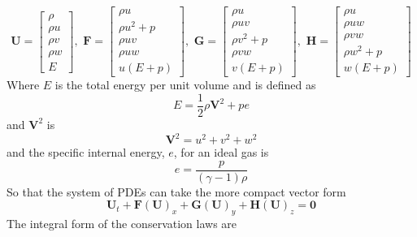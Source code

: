 \begin{equation}
	\boldsymbol{U} =
	\begin{bmatrix}
		\rho\\
		\rho u\\
		\rho v\\
		\rho w\\
		E
	\end{bmatrix},\,\,
	\boldsymbol{F} =
	\begin{bmatrix}
		\rho u\\
		\rho u^2 + p\\
		\rho u v\\
		\rho u w\\
		u\left(E + p\right)
	\end{bmatrix},\,\,
	\boldsymbol{G} =
	\begin{bmatrix}
		\rho u\\
		\rho u v\\
		\rho v^2 + p\\
		\rho v w\\
		v\left(E + p\right)
	\end{bmatrix},\,\,
	\boldsymbol{H} =
	\begin{bmatrix}
		\rho u\\
		\rho u w\\
		\rho v w\\
		\rho w^2 + p\\
		w\left(E + p\right)
	\end{bmatrix}
\end{equation}
Where $E$ is the total energy per unit volume and is defined as
\begin{equation}
	E = \frac{1}{2} \rho \boldsymbol{V}^2 + pe
\end{equation}
and $\boldsymbol{V}^2$ is
\begin{equation}
	\boldsymbol{V}^2 = u^2 + v^2 + w^2
\end{equation}
and the specific internal energy, $e$, for an ideal gas is
\begin{equation}\label{eqn:idealgasEOS}
	e = \frac{p}{\left(\gamma - 1\right) \rho}
\end{equation}
So that the system of PDEs can take the more compact vector form
\begin{equation}\label{eqn:EulerVector}
	\boldsymbol{U}_t + \boldsymbol{F}\left(\boldsymbol{U}\right)_x + \boldsymbol{G}\left(\boldsymbol{U}\right)_y + \boldsymbol{H}\left(\boldsymbol{U}\right)_z = \boldsymbol{0}
\end{equation}
The integral form of the conservation laws are
